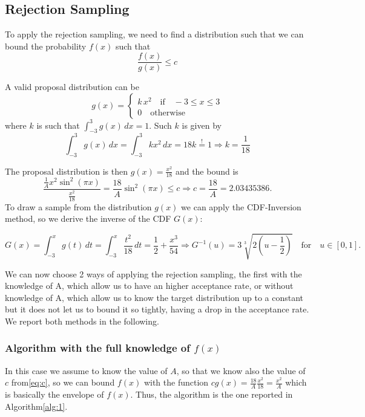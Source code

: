 \documentclass[a4paper,12pt]{article}
\begin{document}
\subsection*{Rejection Sampling}
To apply the rejection sampling, we need to find a distribution such that we can bound the probability $f(x)$ such that
\begin{equation*}
  \frac{f(x)}{g(x)} \leq c
\end{equation*}

A valid proposal distribution can be
\begin{equation*}
  g(x) =
  \begin{cases}
    k \, x^2 \quad \text{if} \quad -3\leq x\leq3 \\
    0 \quad \text{otherwise}
  \end{cases}
\end{equation*}
where $k$ is such that $\int_{-3}^{3} g(x) \, dx =1$.
Such $k$ is given by
\begin{equation*}
  \int_{-3}^{3} g(x) \, dx =\int_{-3}^{3} kx^2 \, dx =  18k \overset{!}{=} 1 \Rightarrow k = \frac{1}{18}
\end{equation*}

The proposal distribution is then $g(x) = \frac{x^2}{18}$ and the bound is
\begin{equation}
  \label{eq:c}
  \frac{\frac{1}{A}x^2\sin^2(\pi x)}{\frac{x^2}{18}} = \frac{18}{A}\sin^2(\pi x) \leq c \Rightarrow c = \frac{18}{A} = 2.03435386.
\end{equation}
To draw a sample from the distribution $g(x)$ we can apply the CDF-Inversion method, so we derive the inverse of the CDF $G(x)$:

\begin{equation*}
  G(x) = \int_{-3}^{x}g(t)\,dt = \int_{-3}^{x} \frac{t^2}{18}\,dt = \frac{1}{2}+\frac{x^3}{54}
  \Rightarrow G^{-1}(u) = 3\sqrt[3]{2(u-\frac{1}{2})} \quad \text{for}\quad u \in [0,1].
\end{equation*}

We can now choose 2 ways of applying the rejection sampling, the first with the knowledge of A, which allow us to have an higher acceptance rate, or without knowledge of A, which allow us to know the target distribution up to a constant but it does not let us to bound it so tightly, having a drop in the acceptance rate. We report both methods in the following.

\subsubsection*{Algorithm with the full knowledge of $f(x)$}
In this case we assume to know the value of $A$, so that we know also the value of $c$ from\ref{eq:c}, so we can bound $f(x)$ with the function $cg(x) = \frac{18}{A}\frac{x^2}{18} =\frac{x^2}{A}$ which is basically the envelope of $f(x)$.
Thus, the algorithm is the one reported in Algorithm\ref{alg:1}.
\end{document}
